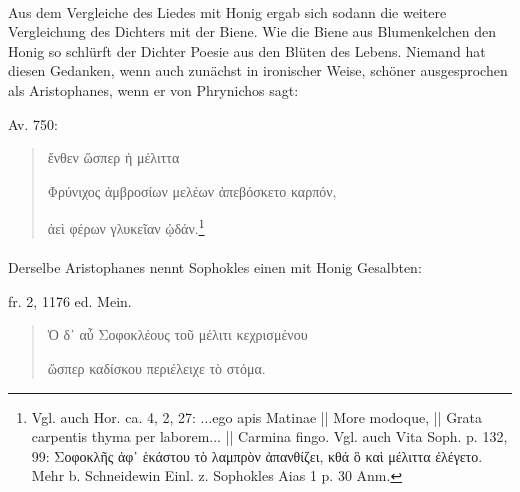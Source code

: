 \documentclass[a4paper, 11pt, oneside]{article}
\begin{document}
\paragraph{}
Aus dem Vergleiche des Liedes mit Honig ergab sich sodann die weitere Vergleichung des Dichters mit der Biene. Wie die Biene aus Blumenkelchen den Honig so schlürft der Dichter Poesie aus den Blüten des Lebens. 
Niemand hat diesen Gedanken, wenn auch zunächst in ironischer Weise, schöner ausgesprochen als Aristophanes, wenn er von Phrynichos sagt:

Av. 750:
\begin{quotation}\large
ἔνθεν ὥσπερ ἡ μέλιττα

Φρύνιχος ἀμβροσίων μελέων ἀπεβόσκετο καρπόν,

ἀεὶ φέρων γλυκεῖαν ᾠδάν.\footnote{Vgl. auch Hor. ca. 4, 2, 27: ...ego apis Matinae || More modoque, || Grata carpentis thyma per laborem... || Carmina fingo. Vgl. auch Vita Soph. p. 132, 99: Σοφοκλῆς ἀφ᾽ ἑκάστου τὸ λαμπρὸν ἀπανθίζει, κθά ὃ καὶ μέλιττα ἐλέγετο. Mehr b. Schneidewin Einl. z. Sophokles Aias 1 p. 30 Anm.}
\end{quotation}
\paragraph{}
Derselbe Aristophanes nennt Sophokles einen mit Honig Gesalbten:

fr. 2, 1176 ed. Mein.
\begin{quotation}\large
Ὁ δ᾽ αὖ Σοφοκλέους τοῦ μέλιτι κεχρισμένου

ὥσπερ καδίσκου περιέλειχε τὸ στόμα.
\end{quotation}
\end{document}
